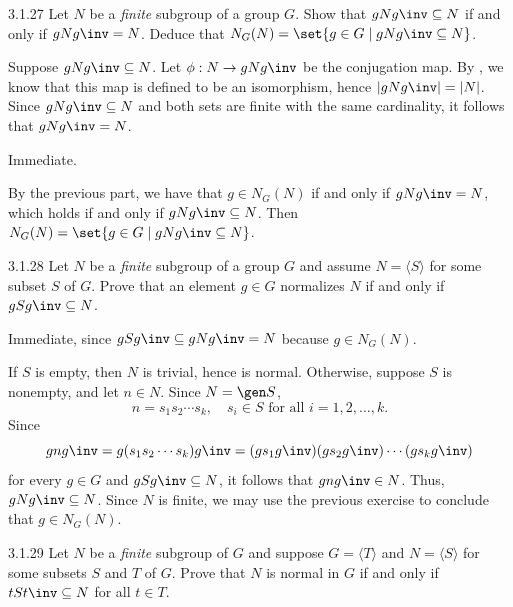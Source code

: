 \begin{exercise}{3.1.27}
    Let $N$ be a \emph{finite} subgroup of a group $G$.
	Show that $gNg\inv \subseteq N$ if and only if $gNg\inv  = N$.
	Deduce that $N_G(N) = \set{g \in G \mid gNg\inv  \subseteq N}$.
\end{exercise}

\begin{soliff}
    \rightimp Suppose $gNg\inv \subseteq N$.
	Let $\phi : N \to gNg\inv$ be the conjugation map.
	By , we know that this map is defined to be an isomorphism, hence $|gNg\inv| = |N|$.
	Since $gNg\inv \subseteq N$ and both sets are finite with the same cardinality, it follows that $gNg\inv = N$.

    \leftimp Immediate.

    By the previous part, we have that $g \in N_G(N)$ if and only if $gNg\inv = N$, which holds if and only if $gNg\inv \subseteq N$.
	Then $N_G(N) = \set{ g \in G \mid gNg\inv  \subseteq N }$.
\end{soliff}

\begin{exercise}{3.1.28}
    Let $N$ be a \emph{finite} subgroup of a group $G$ and assume $N = \langle S \rangle$ for some subset $S$ of $G$.
	Prove that an element $g \in G$ normalizes $N$ if and only if $gSg\inv  \subseteq N$.
\end{exercise}

\begin{soliff}
    \rightimp Immediate, since $gSg\inv \subseteq gNg\inv = N$ because $g \in N_G(N)$.

    \leftimp If $S$ is empty, then $N$ is trivial, hence is normal.
	Otherwise, suppose $S$ is nonempty, and let $n \in N$.
	Since $N = \gen S$,
    \[
    	n = s_1s_2 \cdots s_k, \quad s_i \in S \text{ for all } i = 1, 2, \ldots, k.
    \]
    Since
    \[
        gng\inv = g(s_1s_2 \cdots s_k)g\inv = (gs_1g\inv)(gs_2g\inv) \cdots (gs_kg\inv)
    \]
    for every $g \in G$ and $gSg\inv \subseteq N$, it follows that $gng\inv \in N$.
    Thus, $gNg\inv \subseteq N$.
	Since $N$ is finite, we may use the previous exercise to conclude that $g \in N_G(N)$.
\end{soliff}

\begin{exercise}{3.1.29}
    Let $N$ be a \emph{finite} subgroup of $G$ and suppose $G = \langle T \rangle$ and $N = \langle S \rangle$ for some subsets $S$ and $T$ of $G$.
	Prove that $N$ is normal in $G$ if and only if $tSt\inv  \subseteq N$ for all $t \in T$.
\end{exercise}

